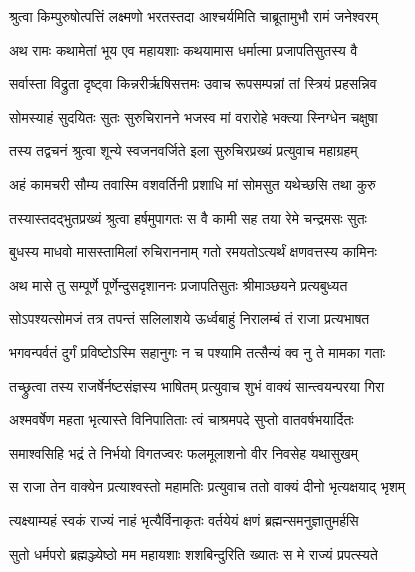 
\twolineshloka
{श्रुत्वा किम्पुरुषोत्पत्तिं लक्ष्मणो भरतस्तदा}
{आश्चर्यमिति चाब्रूतामुभौ रामं जनेश्वरम्} %

\twolineshloka
{अथ रामः कथामेतां भूय एव महायशाः}
{कथयामास धर्मात्मा प्रजापतिसुतस्य वै} %

\twolineshloka
{सर्वास्ता विद्रुता दृष्ट्वा किन्नरीर्ऋषिसत्तमः}
{उवाच रूपसम्पन्नां तां स्त्रियं प्रहसन्निव} %

\twolineshloka
{सोमस्याहं सुदयितः सुतः सुरुचिरानने}
{भजस्व मां वरारोहे भक्त्या स्निग्धेन चक्षुषा} %

\twolineshloka
{तस्य तद्वचनं श्रुत्वा शून्ये स्वजनवर्जिते}
{इला सुरुचिरप्रख्यं प्रत्युवाच महाग्रहम्} %

\twolineshloka
{अहं कामचरी सौम्य तवास्मि वशवर्तिनी}
{प्रशाधि मां सोमसुत यथेच्छसि तथा कुरु} %

\twolineshloka
{तस्यास्तदद्भुतप्रख्यं श्रुत्वा हर्षमुपागतः}
{स वै कामी सह तया रेमे चन्द्रमसः सुतः} %

\twolineshloka
{बुधस्य माधवो मासस्तामिलां रुचिराननाम्}
{गतो रमयतोऽत्यर्थं क्षणवत्तस्य कामिनः} %

\twolineshloka
{अथ मासे तु सम्पूर्णे पूर्णेन्दुसदृशाननः}
{प्रजापतिसुतः श्रीमाञ्छयने प्रत्यबुध्यत} %

\twolineshloka
{सोऽपश्यत्सोमजं तत्र तपन्तं सलिलाशये}
{ऊर्ध्वबाहुं निरालम्बं तं राजा प्रत्यभाषत} %

\twolineshloka
{भगवन्पर्वतं दुर्गं प्रविष्टोऽस्मि सहानुगः}
{न च पश्यामि तत्सैन्यं क्व नु ते मामका गताः} %

\twolineshloka
{तच्छ्रुत्वा तस्य राजर्षेर्नष्टसंज्ञस्य भाषितम्}
{प्रत्युवाच शुभं वाक्यं सान्त्वयन्परया गिरा} %

\twolineshloka
{अश्मवर्षेण महता भृत्यास्ते विनिपातिताः}
{त्वं चाश्रमपदे सुप्तो वातवर्षभयार्दितः} %

\twolineshloka
{समाश्वसिहि भद्रं ते निर्भयो विगतज्वरः}
{फलमूलाशनो वीर निवसेह यथासुखम्} %

\twolineshloka
{स राजा तेन वाक्येन प्रत्याश्वस्तो महामतिः}
{प्रत्युवाच ततो वाक्यं दीनो भृत्यक्षयाद् भृशम्} %

\twolineshloka
{त्यक्ष्याम्यहं स्वकं राज्यं नाहं भृत्यैर्विनाकृतः}
{वर्तयेयं क्षणं ब्रह्मन्समनुज्ञातुमर्हसि} %

\twolineshloka
{सुतो धर्मपरो ब्रह्मञ्ज्येष्ठो मम महायशाः}
{शशबिन्दुरिति ख्यातः स मे राज्यं प्रपत्स्यते} %

